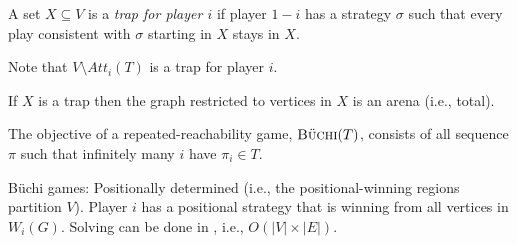 \documentclass[a4paper,10pt]{article}
\newcommand{\rep}[1]{\textsc{B\"uchi}(#1)}
\begin{document}
\begin{definition}
A set $X \subseteq V$ is a \emph{trap for player $i$} if player $1-i$ has a strategy $\sigma$ 
such that every play consistent with $\sigma$ starting in $X$ stays in $X$.
\end{definition}

Note that $V \setminus Att_i(T)$ is a trap for player $i$.

\begin{lemma}
 If $X$ is a trap then the graph restricted to vertices in $X$ is an arena (i.e., total).
\end{lemma}




\begin{definition}
The objective of a repeated-reachability game, $\rep{T}$, consists of all sequence $\pi$ such that infinitely many $i$ have $\pi_i \in T$. 
\end{definition}



\begin{theorem}
B\"uchi games:
\en
\- Positionally determined (i.e., the positional-winning regions partition $V$).
\- Player $i$ has a positional strategy that is winning from all vertices in $W_i(G)$.
\- Solving can be done in \ptime, i.e., $O(|V|\times |E|)$.
\ne
\end{theorem}
\end{document}
